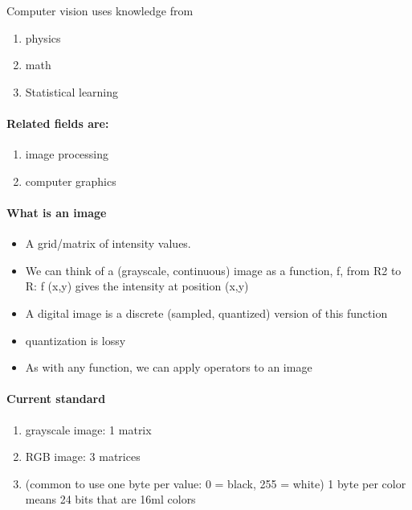 Computer vision uses knowledge from
\begin{enumerate}
    \item physics
    \item math
    \item Statistical learning
\end{enumerate}


\paragraph*{Related fields are:}
\begin{enumerate}
    \item image processing
    \item computer graphics
\end{enumerate}


\paragraph*{What is an image}
\begin{itemize}
    \item A grid/matrix of intensity values.
    \item We can think of a (grayscale, continuous)
          image as a function, f, from R2 to R: f (x,y) gives
          the intensity at position (x,y)
    \item A digital image is a discrete (sampled, quantized)
          version of this function
\end{itemize}


\begin{itemize}
    \item quantization is lossy
    \item As with any function, we can apply operators to an image
\end{itemize}


\paragraph*{Current standard}
\begin{enumerate}
    \item grayscale image: 1 matrix
    \item RGB image: 3 matrices
    \item (common to use one byte per value: 0 = black, 255 = white)
          1 byte per color means 24 bits that are 16ml colors
\end{enumerate}

